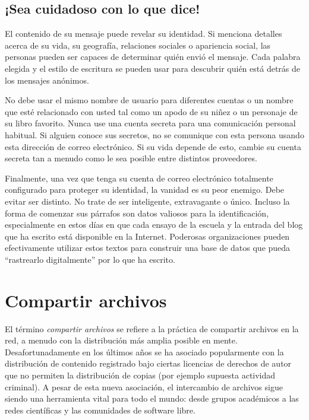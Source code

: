 \documentclass[10pt,a5paper,twoside,,]{book}
\begin{document}
\section{¡Sea cuidadoso con lo que
dice!}\label{sea-cuidadoso-con-lo-que-dice}

El contenido de su mensaje puede revelar su identidad. Si menciona
detalles acerca de su vida, su geografía, relaciones sociales o
apariencia social, las personas pueden ser capaces de determinar quién
envió el mensaje. Cada palabra elegida y el estilo de escritura se
pueden usar para descubrir quién está detrás de los mensajes anónimos.

No debe usar el mismo nombre de usuario para diferentes cuentas o un
nombre que esté relacionado con usted tal como un apodo de su niñez o un
personaje de su libro favorito. Nunca use una cuenta secreta para una
comunicación personal habitual. Si alguien conoce sus secretos, no se
comunique con esta persona usando esta dirección de correo electrónico.
Si su vida depende de esto, cambie su cuenta secreta tan a menudo como
le sea posible entre distintos proveedores.

Finalmente, una vez que tenga su cuenta de correo electrónico totalmente
configurado para proteger su identidad, la vanidad es su peor enemigo.
Debe evitar ser distinto. No trate de ser inteligente, extravagante o
único. Incluso la forma de comenzar sus párrafos son datos valiosos para
la identificación, especialmente en estos días en que cada ensayo de la
escuela y la entrada del blog que ha escrito está disponible en la
Internet. Poderosas organizaciones pueden efectivamente utilizar estos
textos para construir una base de datos que pueda ``rastrearlo
digitalmente'' por lo que ha escrito.

\chapter{Compartir archivos}\label{compartir-archivos}

El término \emph{compartir archivos} se refiere a la práctica de
compartir archivos en la red, a menudo con la distribución más amplia
posible en mente. Desafortunadamente en los últimos años se ha asociado
popularmente con la distribución de contenido registrado bajo ciertas
licencias de derechos de autor que no permiten la distribución de copias
(por ejemplo supuesta actividad criminal). A pesar de esta nueva
asociación, el intercambio de archivos sigue siendo una herramienta
vital para todo el mundo: desde grupos académicos a las redes
científicas y las comunidades de software libre.
\end{document}
